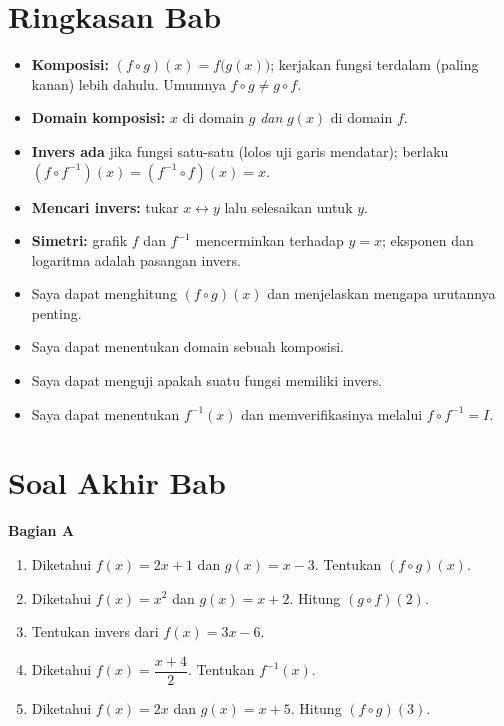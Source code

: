 \documentclass[11pt,a4paper]{report}
\theoremstyle{gaya}
\newcommand{\bagiansoal}[2]{%
  \par\medskip\noindent
  {\large\bfseries\color{biru}Bagian #1}\par\smallskip
  \addcontentsline{toc}{subsection}{Bagian #1}}
\newcommand{\cek}{\ding{113}\ } %
\begin{document}
\section*{Ringkasan Bab}
\begin{itemize}[leftmargin=*,topsep=2pt]
  \item \textbf{Komposisi:} $(f\circ g)(x)=f\big(g(x)\big)$; kerjakan fungsi terdalam (paling kanan) lebih dahulu. Umumnya $f\circ g\neq g\circ f$.
  \item \textbf{Domain komposisi:} $x$ di domain $g$ \emph{dan} $g(x)$ di domain $f$.
  \item \textbf{Invers ada} jika fungsi satu-satu (lolos uji garis mendatar); berlaku $(f\circ f^{-1})(x)=(f^{-1}\circ f)(x)=x$.
  \item \textbf{Mencari invers:} tukar $x\leftrightarrow y$ lalu selesaikan untuk $y$.
  \item \textbf{Simetri:} grafik $f$ dan $f^{-1}$ mencerminkan terhadap $y=x$; eksponen dan logaritma adalah pasangan invers.
\end{itemize}

\begin{refleksi}
\begin{itemize}[leftmargin=*,topsep=2pt]
  \item[\cek] Saya dapat menghitung $(f\circ g)(x)$ dan menjelaskan mengapa urutannya penting.
  \item[\cek] Saya dapat menentukan domain sebuah komposisi.
  \item[\cek] Saya dapat menguji apakah suatu fungsi memiliki invers.
  \item[\cek] Saya dapat menentukan $f^{-1}(x)$ dan memverifikasinya melalui $f\circ f^{-1}=I$.
\end{itemize}
\end{refleksi}

\section*{Soal Akhir Bab \thechapter}

\bagiansoal{A}{(Fundamental --- setara SNBT Dasar)}
\begin{enumerate}[leftmargin=*]
  \item Diketahui $f(x)=2x+1$ dan $g(x)=x-3$. Tentukan $(f\circ g)(x)$.
  \item Diketahui $f(x)=x^2$ dan $g(x)=x+2$. Hitung $(g\circ f)(2)$.
  \item Tentukan invers dari $f(x)=3x-6$.
  \item Diketahui $f(x)=\dfrac{x+4}{2}$. Tentukan $f^{-1}(x)$.
  \item Diketahui $f(x)=2x$ dan $g(x)=x+5$. Hitung $(f\circ g)(3)$.
\end{enumerate}
\end{document}
